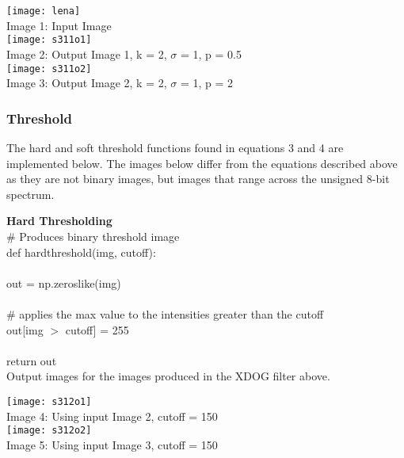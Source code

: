 \documentclass{article}
\begin{document}
	\begin{center}
		\noindent \texttt{[image: lena]}\\
		Image 1: Input Image\\
			
		\texttt{[image: s311o1]}\\
		Image 2: Output Image 1, k = 2, $\sigma$ = 1, p = 0.5 \\
		
		\texttt{[image: s311o2]}\\
		Image 3: Output Image 2, k = 2, $\sigma$ = 1, p = 2 \\
	\end{center}

	\subsubsection{Threshold}
		
	The hard and soft threshold functions found in equations 3 and 4 are implemented below. The images below differ from the equations described above as they are not binary images, but images that range across the unsigned 8-bit spectrum.\\
		
	\smallskip	
	
	\noindent \textbf{Hard Thresholding}\\
		
	\noindent \# Produces binary threshold image\\
	\noindent def hard\textunderscore threshold(img, cutoff):\\
	\\
	\indent out = np.zeros\textunderscore like(img)\\
	\\
	\indent \# applies the max value to the intensities greater than the cutoff\\
	\indent out[img $>$ cutoff] = 255\\
	\\	
	\indent return out\\
	
	Output images for the images produced in the XDOG filter above.\\
	
	\begin{center}
		
		\texttt{[image: s312o1]}\\
		Image 4: Using input Image 2, cutoff = 150\\
	
		\texttt{[image: s312o2]}\\
		Image 5: Using input Image 3, cutoff = 150\\
	\end{center}
	
\end{document}
